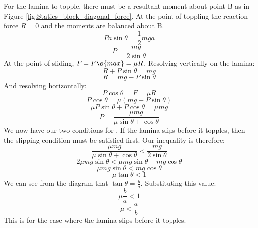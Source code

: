 \begin{problem}
{For the lamina to topple, there must be a resultant moment about point B as in Figure \ref{fig:Statics_block_diagonal_force}. At the point of toppling the reaction force $R = 0$ and the moments are balanced about B.
\begin{equation*}	
Pa\sin{\theta} = \frac{1}{2}mga	
\end{equation*}
\begin{equation*}	
P = \frac{mg}{2\sin{\theta}}	
\end{equation*}
At the point of sliding, $F = F\s{max} = \mu R$. Resolving vertically on the lamina:
\begin{equation*}	
R + P\sin{\theta} = mg	
\end{equation*}
\begin{equation}	
R = mg - P\sin{\theta} \label{eq:sliding_reaction_force}	
\end{equation}
And resolving horizontally:
\begin{equation*}	
P\cos{\theta} = F = \mu R 	
\end{equation*}
\begin{equation*}	
P\cos{\theta} = \mu\left(mg - P\sin{\theta}\right)	
\end{equation*}
\begin{equation*}	
\mu P\sin{\theta} + P\cos{\theta} = \mu mg	
\end{equation*}
\begin{equation*}	
P = \frac{\mu mg}{\mu\sin{\theta} + \cos{\theta}}	
\end{equation*}
We now have our two conditions for . If the lamina slips before it topples, then the slipping condition must be satisfied first. Our inequality is therefore:
\begin{equation*}  
\frac{\mu mg}{\mu\sin{\theta} + \cos{\theta}} < \frac{mg}{2\sin{\theta}}	
\end{equation*}
\begin{equation*} 
2\mu mg\sin{\theta} < \mu mg\sin{\theta} + mg\cos{\theta}	
\end{equation*}
\begin{equation*}	
\mu mg\sin{\theta} < mg\cos{\theta}	
\end{equation*}
\begin{equation*} 	
\mu\tan{\theta} < 1	
\end{equation*}
We can see from the diagram that $\tan{\theta} = \frac{b}{a}$. Substituting this value:
\begin{equation*}	
\mu\frac{b}{a} < 1	
\end{equation*}
\begin{equation*}	
\mu < \frac{a}{b}	
\end{equation*}
This is for the case where the lamina slips before it topples.

}
\end{problem}
